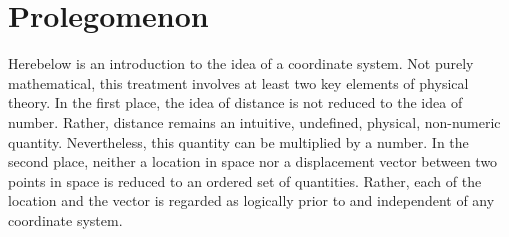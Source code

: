 \cleardoublepage
\chapter*{Prolegomenon}

Herebelow is an introduction to the idea of a coordinate system.  Not purely
mathematical, this treatment involves at least two key elements of physical
theory.  In the first place, the idea of distance is not reduced to the idea of
number.  Rather, distance remains an intuitive, undefined, physical,
non-numeric quantity.  Nevertheless, this quantity can be multiplied by a
number.  In the second place, neither a location in space nor a displacement
vector between two points in space is reduced to an ordered set of quantities.
Rather, each of the location and the vector is regarded as logically prior to
and independent of any coordinate system.

